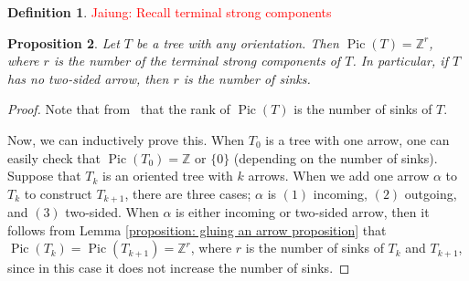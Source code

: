 \documentclass[11pt,reqno]{amsart}
\DeclareMathOperator{\Pic}{Pic}
\theoremstyle{definition}
\newtheorem{mydef}{\textbf{Definition}}[section]
\theoremstyle{plain}
\newtheorem{pro}[mydef]{\textbf{Proposition}}
\begin{document}
\begin{mydef}
\textcolor{red}{Jaiung: Recall terminal strong components}
\end{mydef}

\begin{pro}
		Let $T$ be a tree with any orientation. Then $\Pic(T)=\mathbb{Z}^r$, where $r$ is the number of the terminal strong components of $T$. In particular, if $T$ has no two-sided arrow, then $r$ is the number of sinks.
	\end{pro}
\begin{proof}
Note that from~\cite[Corollary 3.5]{wagner2000critical} that the rank of $\Pic(T)$ is the number of sinks of $T$.

Now, we can inductively prove this. When $T_0$ is a tree with one arrow, one can easily check that $\Pic(T_0) =\mathbb{Z}$ or $\{0\}$ (depending on the number of sinks). Suppose that $T_k$ is an oriented tree with $k$ arrows. When we add one arrow $\alpha$ to $T_k$ to construct $T_{k+1}$, there are three cases; $\alpha$ is $(1)$ incoming, $(2)$ outgoing, and $(3)$ two-sided. When $\alpha$ is either incoming or two-sided arrow, then it follows from Lemma \ref{proposition: gluing an arrow proposition} that $\Pic(T_k)=\Pic(T_{k+1})=\mathbb{Z}^r$, where $r$ is the number of sinks of $T_k$ and $T_{k+1}$, since in this case it does not increase the number of sinks.


\end{proof}
\end{document}
